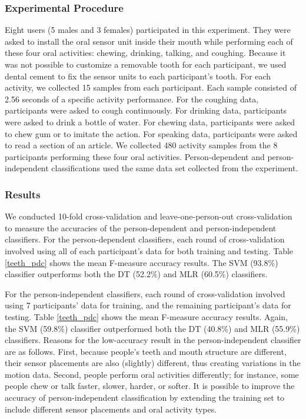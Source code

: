 \subsubsection{Experimental Procedure}
Eight users (5 males and 3 females) participated in this experiment. They were asked to install the oral sensor unit inside their mouth while performing each of these four oral activities: chewing, drinking, talking, and coughing. Because it was not possible to customize a removable tooth for each participant, we used dental cement to fix the sensor units to each participant's tooth. For each activity, we collected 15 samples from each participant. Each sample consisted of 2.56 seconds of a specific activity performance. For the coughing data, participants were asked to cough continuously. For drinking data, participants were asked to drink a bottle of water. For chewing data, participants were asked to chew gum or to imitate the action. For speaking data, participants were asked to read a section of an article. We collected 480 activity samples from the 8 participants performing these four oral activities. Person-dependent and person-independent classifications used the same data set collected from the experiment.

\subsubsection{Results}
We conducted 10-fold cross-validation and leave-one-person-out cross-validation to measure the accuracies of the person-dependent and person-independent classifiers. For the person-dependent classifiers, each round of cross-validation involved using all of each participant's data for both training and testing. Table \ref{teeth_pdc} shows the mean F-measure accuracy results. The SVM (93.8\%) classifier outperforms both the DT (52.2\%) and MLR (60.5\%) classifiers.  

For the person-independent classifiers, each round of cross-validation involved using 7 participants' data for training, and the remaining participant's data for testing. Table \ref{teeth_pdc} shows the mean F-measure accuracy results. Again, the SVM (59.8\%) classifier outperformed both the DT (40.8\%) and MLR (55.9\%) classifiers. Reasons for the low-accuracy result in the person-independent classifier are as follows.
First, because people's teeth and mouth structure are different, their sensor placements are also (slightly) different, thus creating variations in the motion data. Second, people perform oral activities differently; for instance, some people chew or talk faster, slower, harder, or softer. It is possible to improve the accuracy of person-independent classification by extending the training set to include different sensor placements and oral activity types.

